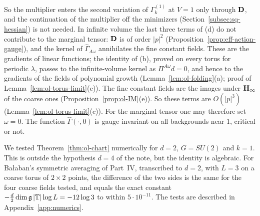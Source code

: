 So the multiplier enters the second variation of $\Gamma^{(1)}_k$ at $V=1$ only through $\mathbf D$, and the continuation of the multiplier off the minimizers (Section~\ref{subsec:sq-hessian}) is not needed. In infinite volume the last three terms of (d) do not contribute to the marginal tensor: $\mathbf D$ is of order $|p|^2$ (Proposition~\ref{prop:eff-action-gauge}), and the kernel of $\widehat\Gamma_{A\omega}$ annihilates the fine constant fields. These are the gradients of linear functions; the identity of (b), proved on every torus for periodic $\lambda$, passes to the infinite-volume kernel as $\Pi^{A\omega}d=0$, and hence to the gradients of the fields of polynomial growth (Lemma~\ref{lem:ol-folding}(a); proof of Lemma~\ref{lem:ol-torus-limit}(c)). The fine constant fields are the images under $\mathbf H_\infty$ of the coarse ones (Proposition~\ref{prop:ol-IM}(e)). So these terms are $O(|p|^3)$ (Lemma~\ref{lem:ol-torus-limit}(c)). For the marginal tensor one may therefore set $\omega=0$. The function $\widehat\Gamma(\cdot,0)$ is gauge invariant on all backgrounds near $1$, critical or not.

\begin{remark}\label{rem:ol-numerical}
We tested Theorem~\ref{thm:ol-chart} numerically for $d=2$, $G=SU(2)$ and $k=1$. This is outside the hypothesis $d=4$ of the note, but the identity is algebraic. For Ba\l aban's symmetric averaging of Part~IV, transcribed to $d=2$, with $L=3$ on a coarse torus of $2\times2$ points, the difference of the two sides is the same for the four coarse fields tested, and equals the exact constant $-\frac d2\dim\mathfrak g\,|\mathbb T|\log L=-12\log3$ to within $5\cdot10^{-11}$. The tests are described in Appendix~\ref{app:numerics}.
\end{remark}

